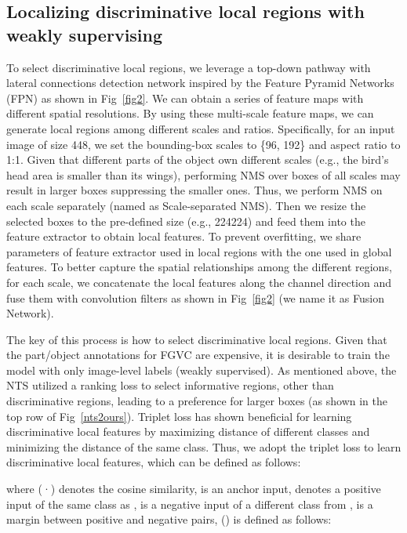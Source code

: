 \documentclass[10pt,twocolumn,letterpaper]{article}
\begin{document}
\subsection{Localizing discriminative local regions with weakly supervising}
To select discriminative local regions, we leverage a top-down pathway with lateral connections detection network inspired by the Feature Pyramid Networks (FPN)\cite{lin2017feature} as shown in Fig~\ref{fig2}. We can obtain a series of feature maps with different spatial resolutions. By using these multi-scale feature maps, we can generate local regions among different scales and ratios. Specifically, for an input image of size 448, we set the bounding-box scales to \{96, 192\} and aspect ratio to 1:1. Given that different parts of the object own different scales (e.g., the bird's head area is smaller than its wings), performing NMS over boxes of all scales may result in larger boxes suppressing the smaller ones.
Thus, we perform NMS on each scale separately (named as Scale-separated NMS). Then we resize the selected boxes to the pre-defined size (e.g., 224224) and feed them into the feature extractor to obtain local features. To prevent overfitting, we share parameters of feature extractor used in local regions with the one used in global features. To better capture the spatial relationships among the different regions, for each scale, we concatenate the local features along the channel direction and fuse them with  convolution filters as shown in Fig~\ref{fig2} (we name it as Fusion Network).

The key of this process is how to select discriminative local regions.
Given that the part/object annotations for FGVC are expensive, it is desirable to train the model with only image-level labels (weakly supervised). 
As mentioned above, the NTS utilized a ranking loss to select informative regions, other than discriminative regions, leading to a preference for larger boxes (as shown in the top row of Fig~\ref{nts2ours}). 
Triplet loss\cite{schroff2015facenet} has shown beneficial for learning
discriminative local features by maximizing distance of different classes and minimizing the distance of the same class.
Thus, we adopt the triplet loss to learn discriminative local features, which can be defined as follows:

where (·) denotes the cosine similarity,  is an anchor input,  denotes a positive input of the same class as ,  is a negative input of a different class from ,  is a margin between positive and negative pairs, () is defined as follows:
\end{document}
